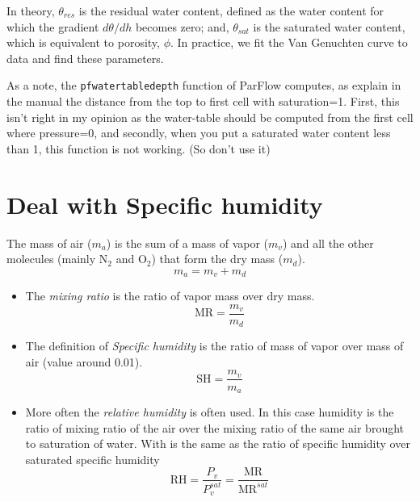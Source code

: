 \documentclass[11pt,a4paper]{report}
\begin{document}
In theory, $\theta_{res}$ is the residual water content, defined as the water content for which the gradient $d\theta/dh$ becomes zero; and, $\theta_{sat}$ is the saturated water content, which is equivalent to porosity, $\phi$. In practice, we fit the Van Genuchten curve to data and find these parameters.

As a note, the \verb$pfwatertabledepth$ function of ParFlow computes, as explain in the manual the distance from the top to first cell with saturation=1. First, this isn't right in my opinion as the water-table should be computed from the first cell where pressure=0, and secondly, when you put a saturated water content less than 1, this function is not working. (So don't use it)










\section{Deal with Specific humidity}
The mass of air ($m_a$) is the sum of a mass of vapor ($m_v$) and all the other molecules (mainly N$_2$ and O$_2$) that form the dry mass ($m_d$).
\begin{equation}
m_a=m_v+m_d
\end{equation}

\begin{itemize}
 \item The \emph{mixing ratio} is the ratio of vapor mass over dry mass.
   \begin{equation}
 \mathrm{MR} = \frac{m_v}{m_d}
 \end{equation}


 \item The definition of \emph{Specific humidity} is the ratio of mass of vapor over mass of air (value around 0.01). 
  \begin{equation}
 \mathrm{SH} = \frac{m_v}{m_a}
 \end{equation}
 
 \item More often the \emph{relative humidity} is often used. In this case humidity is the ratio of mixing ratio of the air over the mixing ratio of the same air brought to saturation of water. With is the same as the ratio of specific humidity over saturated specific humidity
 \begin{equation}
 \mathrm{RH} = \frac{P_v}{P_v^{sat}} = \frac{\mathrm{MR}}{\mathrm{MR}^{sat}}
 \end{equation}
 
\end{itemize} 
 
\end{document}

